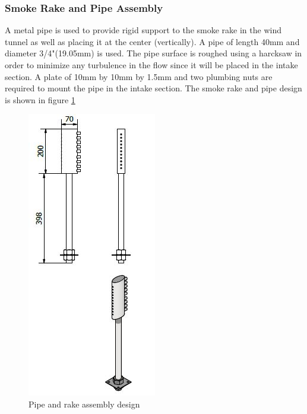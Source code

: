 \subsubsection{Smoke Rake and Pipe Assembly}
A metal pipe is used to provide rigid support to the smoke rake in the wind tunnel as well as placing it at the center
(vertically). A pipe of length 40mm and diameter 3/4"(19.05mm) is used. The pipe surface is roughed using a harcksaw in 
order to minimize any turbulence in the flow since it will be placed in the intake section. A plate of 10mm by 10mm by 1.5mm 
and two plumbing nuts are required to mount the pipe in the intake section. The smoke rake and pipe design is shown 
in figure \ref{pipe and rake}
\begin{center}
	\begin{figure}[H]
	\centering
	\includegraphics[width=0.25\linewidth]{Figures/pipe and rake.JPG}
	\caption[Pipe and rake]{Pipe and rake assembly design}
	\label{pipe and rake}
	\end{figure}
\end{center}